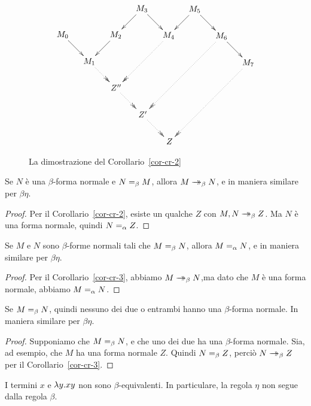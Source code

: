 \documentclass{article}
\begin{document}
\begin{figure}
\vspace{-6em}
\[ \xymatrix@dr{
  && M_5\ar@{->}[r]\ar@{->}[d]
  & M_6\ar@{->}[r]\ar@{.>>}[ddd]
  & M_7\ar@{.>>}[ddd]
  \\& M_3\ar@{->}[r]\ar@{->}[d]
  & M_4\ar@{.>>}[dd]
  \\& M_2\ar@{->}[d]
  \\ M_0\ar@{->}[r]
  & M_1\ar@{.>>}[r]
  & Z''\ar@{.>>}[r]
  & Z'\ar@{.>>}[r]
  & Z
  }
\]
\caption{La dimostrazione del Corollario~\ref{cor-cr-2}}
\label{fig-cor-cr-2}
\end{figure}

\begin{corollary}\label{cor-cr-3}
  Se $N$ \`e una $\beta$-forma normale e $N=_{\beta} M$, allora $M\mathrel{\rightarrow\!\!\!\!\!\rightarrow}_{\beta} N$, e
  in maniera similare per $\beta\eta$.
\end{corollary}

\begin{proof}
  Per il Corollario~\ref{cor-cr-2}, esiste un qualche $Z$ con $M,N\mathrel{\rightarrow\!\!\!\!\!\rightarrow}_{\beta}
  Z$. Ma $N$ \`e una forma normale, quindi $N=_{\alpha} Z$. \eot
\end{proof}

\begin{corollary}\label{cor-cr-4}
  Se $M$ e $N$ sono $\beta$-forme normali tali che $M=_{\beta} N$, allora
  $M=_{\alpha} N$, e in maniera similare per $\beta\eta$.
\end{corollary}

\begin{proof}
  Per il Corollario~\ref{cor-cr-3}, abbiamo $M\mathrel{\rightarrow\!\!\!\!\!\rightarrow}_{\beta} N$,ma dato che $M$ \`e una
  forma normale, abbiamo $M=_{\alpha} N$. \eot
\end{proof}

\begin{corollary}
  Se $M=_{\beta} N$, quindi nessuno dei due o entrambi hanno una $\beta$-forma
  normale. In maniera similare per $\beta\eta$.
\end{corollary}

\begin{proof}
  Supponiamo che $M=_{\beta} N$, e che uno dei due ha una $\beta$-forma
  normale. Sia, ad esempio, che $M$ ha una forma normale $Z$. Quindi $N=_{\beta}
  Z$, perci\`o $N\mathrel{\rightarrow\!\!\!\!\!\rightarrow}_{\beta} Z$ per il Corollario~\ref{cor-cr-3}. \eot
\end{proof}

\begin{corollary}\label{cor-beta-not-eta}
  I termini $x$ e $\lambda y.xy$ non sono $\beta$-equivalenti. In
  particulare, la regola $\eta$ non segue dalla regola $\beta$.
\end{corollary}
\end{document}
